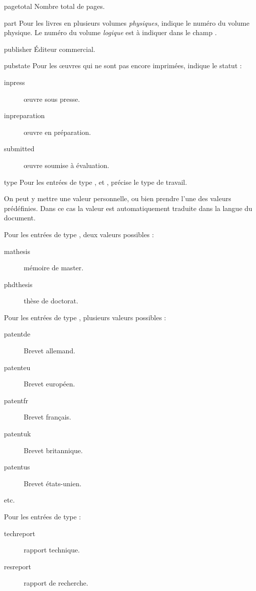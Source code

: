 \begin{choix}
	\item[pagetotal] Nombre total de pages.
   	\item[part] Pour les livres en plusieurs volumes \emph{physiques}, indique le numéro du volume physique.  Le numéro du volume \emph{logique} est à indiquer dans le champ .
   	\item[publisher] Éditeur commercial.					
   	\item[pubstate] Pour les œuvres qui ne sont pas encore imprimées, indique le statut :
					\begin{description}
						\item[inpress]œuvre sous presse.
						\item[inpreparation]œuvre en préparation.
						\item[submitted]œuvre soumise à évaluation.
					\end{description}
					
					
   	\item[type] Pour les entrées de type  ,  et , précise le type de travail.
	
	On peut y mettre une valeur personnelle, ou bien prendre l'une des valeurs prédéfinies. Dans ce cas la valeur est automatiquement traduite dans la langue du document.
	
	 Pour les entrées de type , deux valeurs possibles :
					\begin{description}
						\item[mathesis]mémoire de master.
						\item[phdthesis]thèse de doctorat.
					\end{description}
					
					 Pour les entrées de type , plusieurs  valeurs possibles : 
					 
					 
					 \begin{description}
						\item[patentde] Brevet allemand.
						\item[patenteu] Brevet européen.
						\item[patentfr] Brevet français.
						\item[patentuk] Brevet britannique.
						\item[patentus] Brevet états-unien.
						\item[etc.]
					 \end{description}
					
					Pour les entrées de type  : \nopagebreak
					\begin{description}
						\item[techreport]rapport technique.
						\item[resreport]rapport de recherche.
					\end{description}
					

\end{choix}
